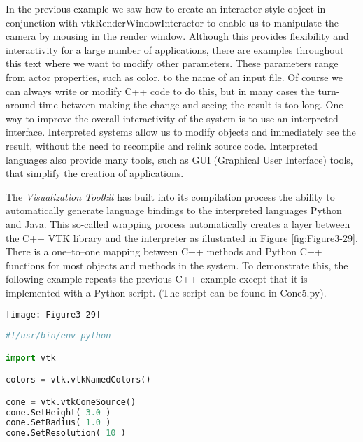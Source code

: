 \begin{description}[leftmargin=0cm,labelindent=0cm]
In the previous example we saw how to create an interactor style object in conjunction with vtkRenderWindowInteractor to enable us to manipulate the camera by mousing in the render window. Although this provides flexibility and interactivity for a large number of applications, there are examples throughout this text where we want to modify other parameters. These parameters range from actor properties, such as color, to the name of an input file. Of course we can always write or modify C++ code to do this, but in many cases the turn-around time between making the change and seeing the result is too long. One way to improve the overall interactivity of the system is to use an interpreted interface. Interpreted systems allow us to modify objects and immediately see the result, without the need to recompile and relink source code. Interpreted languages also provide many tools, such as GUI (Graphical User Interface) tools, that simplify the creation of applications.

\begin{minipage}{.6\linewidth}
The \emph{Visualization Toolkit} has built into its compilation process the ability to automatically generate language bindings to the interpreted languages Python and Java. This so-called wrapping process automatically creates a layer between the C++ VTK library and the interpreter as illustrated in Figure \ref{fig:Figure3-29}. There is a one--to--one mapping between C++ methods and Python C++ functions for most objects and methods in the system. To demonstrate this, the following example repeats the previous C++ example except that it is implemented with a Python script. (The script can be found in Cone5.py).
\end{minipage}
\hfill
\begin{minipage}{.25\linewidth}
  \centering
  \texttt{[image: Figure3-29]}
  \label{fig:Figure3-29}
\end{minipage}

\begin{lstlisting}[language=Python, caption={Cone5.py}, escapechar=\$]
#!/usr/bin/env python

import vtk

colors = vtk.vtkNamedColors()

cone = vtk.vtkConeSource()
cone.SetHeight( 3.0 )
cone.SetRadius( 1.0 )
cone.SetResolution( 10 )


\end{lstlisting}
\end{description}
